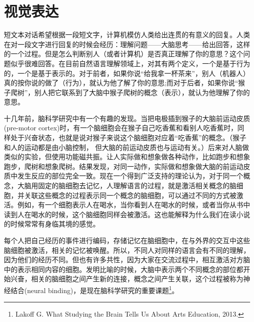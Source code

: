 \chapter{视觉表达}
短文本对话希望根据一段短文字，计算机模仿人类给出连贯的有意义的回复。人类在对一段文字进行回复的时候会经历：理解问题——大脑思考——给出回答，这样的一个过程。但是怎么判断别人（或者计算机）是否真正理解了你的意思？这个问题似乎很难回答。在目前自然语言理解领域上，对其有两个定义，一个是基于行为的，一个是基于表示的。对于前者，如果你说“给我拿一杯茶来”，别人（机器人）真的按你说的做了（行为），就认为他了解了你的意思;而对于后者，如果你说“猴子爬树”，别人把它联系到了大脑中猴子爬树的概念（表示），就认为他理解了你的意思。


十几年前，脑科学研究中有一个有趣的发现。当把电极插到猴子的大脑前运动皮质(pre-motor cortex)时，有一个脑细胞会在猴子自己吃香蕉和看别人吃香蕉时，同样处于兴奋状态，也就是说对猴子来说这个脑细胞对应着“吃香蕉”的概念。（猴子和人的运动都是由小脑控制， 但大脑的前运动皮质也与运动有关。）后来对人脑做类似的实验，但使用功能磁共振。让人实际做和想象做各种动作，比如跑步和想象跑步，爬树和想象爬树。结果发现，对同一动作，实际做和想象做大脑的前运动皮质中发生反应的部位完全一致。现在一个得到广泛支持的理论认为，对于同一个概念，大脑用固定的脑细胞去记忆，人理解语言的过程，就是激活相关概念的脑细胞，并关联这些概念的过程表示同一个概念的脑细胞，可以通过不同的方式被激活。例如，有一个细胞表示人在喝水，当你看到人在喝水的时候，或者当你从书中读到人在喝水的时候，这个脑细胞同样会被激活。这也能解释为什么我们在读小说的时候常常有身临其境的感觉。\cite{NLPnewTime} 

每个人把自己经历的事件进行编码，存储记忆在脑细胞中，在与外界的交互中这些脑细胞被激活，相关的记忆被唤醒。所以，不同人对同样的语言会有不同的理解，因为他们的经历不同。但也有许多共性，因为大家在交流过程中，相互激活对方脑中的表示相同内容的细胞。发明比喻的时候，大脑中表示两个不同概念的部位都开始兴奋，相关的脑细胞之间产生新的连接，概念之间产生关联，这个过程被称为神经结合(neural binding)，是现在脑科学研究的重要课题\footnote{Lakoff G. What Studying the Brain Tells Us About Arts Education, 2013.}。

